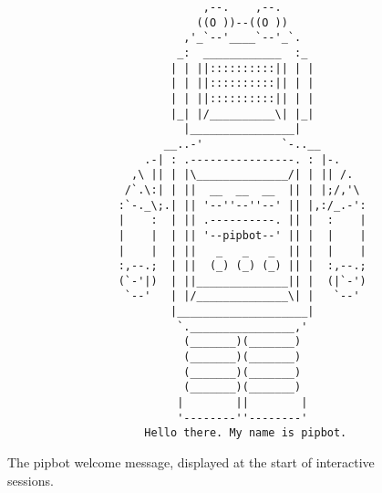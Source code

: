 \begin{figure}[H]
\begin{verbatim}
                              ,--.    ,--.
                             ((O ))--((O ))
                           ,'_`--'____`--'_`.
                          _:  ____________  :_
                         | | ||::::::::::|| | |
                         | | ||::::::::::|| | |
                         | | ||::::::::::|| | |
                         |_| |/__________\| |_|
                           |________________|
                        __..-'            `-..__
                     .-| : .----------------. : |-.
                   ,\ || | |\______________/| | || /.
                  /`.\:| | ||  __  __  __  || | |;/,'\
                 :`-._\;.| || '--''--''--' || |,:/_.-':
                 |    :  | || .----------. || |  :    |
                 |    |  | || '--pipbot--' || |  |    |
                 |    |  | ||   _   _   _  || |  |    |
                 :,--.;  | ||  (_) (_) (_) || |  :,--.;
                 (`-'|)  | ||______________|| |  (|`-')
                  `--'   | |/______________\| |   `--'
                         |____________________|
                          `.________________,'
                           (_______)(_______)
                           (_______)(_______)
                           (_______)(_______)
                           (_______)(_______)
                          |        ||        |
                          '--------''--------'
                     Hello there. My name is pipbot.
\end{verbatim}
\caption[The pipbot welcome message]
  {The pipbot welcome message, displayed at the start of interactive sessions.}
\label{fig:pipbot-logo}
\end{figure}

\lipsum[33-37]

